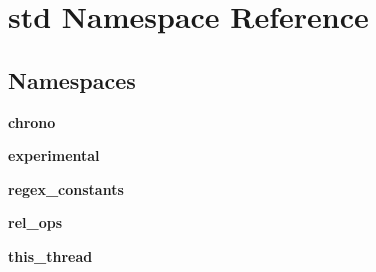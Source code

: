 \hypertarget{namespacestd}{}\section{std Namespace Reference}
\label{namespacestd}
\subsection*{Namespaces}
\begin{DoxyCompactItemize}
\item 
 {\bf chrono}
\item 
 {\bf experimental}
\item 
 {\bf regex\+\_\+constants}
\item 
 {\bf rel\+\_\+ops}
\item 
 {\bf this\+\_\+thread}
\end{DoxyCompactItemize}
